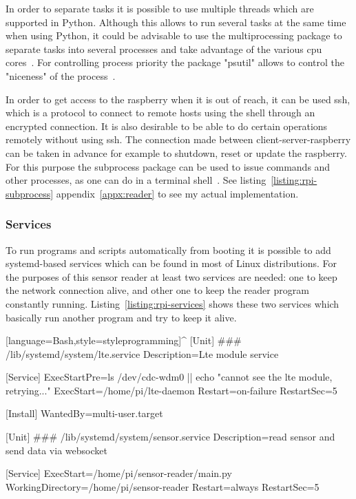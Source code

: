 \documentclass[hidelinks,11pt,a4paper,oneside,article]{memoir}
\begin{document}
In order to separate tasks it is possible to use multiple threads which are supported in Python. Although this allows to run several tasks at the same time when using Python, it could be advisable to use the multiprocessing package to separate tasks into several processes and take advantage of the various \gls{cpu} cores~\cite{python-multi}. For controlling process priority the package "psutil" allows to control the "niceness" of the process~\cite{python-psutil}.

In order to get access to the raspberry when it is out of reach, it can be used \gls{ssh}, which is a protocol to connect to remote hosts using the shell through an encrypted connection. It is also desirable to be able to do certain operations remotely without using \gls{ssh}. The connection made between client-server-raspberry can be taken in advance for example to shutdown, reset or update the raspberry. For this purpose the subprocess package can be used to issue commands and other processes, as one can do in a terminal shell~\cite{python-subprocess}. See listing~\ref{listing:rpi-subprocess} appendix~\ref{appx:reader} to see my actual implementation.

\subsubsection{Services}
To run programs and scripts automatically from booting it is possible to add systemd-based services which can be found in most of Linux distributions. For the purposes of this sensor reader at least two services are needed: one to keep the network connection alive, and other one to keep the reader program constantly running. Listing~\ref{listing:rpi-services} shows these two services which basically run another program and try to keep it alive.

[language=Bash,style=styleprogramming]^
[Unit]
### /lib/systemd/system/lte.service
Description=Lte module service

[Service]
ExecStartPre=ls /dev/cdc-wdm0 || echo "cannot see the lte module, retrying..."
ExecStart=/home/pi/lte-daemon
Restart=on-failure
RestartSec=5

[Install]
WantedBy=multi-user.target

[Unit]
### /lib/systemd/system/sensor.service
Description=read sensor and send data via websocket

[Service]
ExecStart=/home/pi/sensor-reader/main.py
WorkingDirectory=/home/pi/sensor-reader
Restart=always
RestartSec=5
\end{document}

